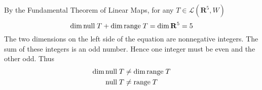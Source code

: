\documentclass[a4paper]{article}
\begin{document}
\newcommand    \C  { \mathbf{C} }
\newcommand    \R  { \mathbf{R} }
\renewcommand  \L  { \mathcal{L} }
\newcommand    \F  { \mathbf{F} }
\newcommand    \nullspace { \text{null\;} }
\newcommand    \range     { \text{range\;} }

By the Fundamental Theorem of Linear Maps, for any $T \in \L(\R^5, W)$
\begin{equation*}
    \dim\nullspace T + \dim\range T  = \dim \R^5 = 5
\end{equation*}
The two dimensions on the left side of the equation are nonnegative integers.
The sum of these integers is an odd number.
Hence one integer must be even and the other odd.
Thus
\begin{align*}
    \dim\nullspace T &\neq \dim\range T             \\
        \nullspace T &\neq \range T
\end{align*}
\end{document}
